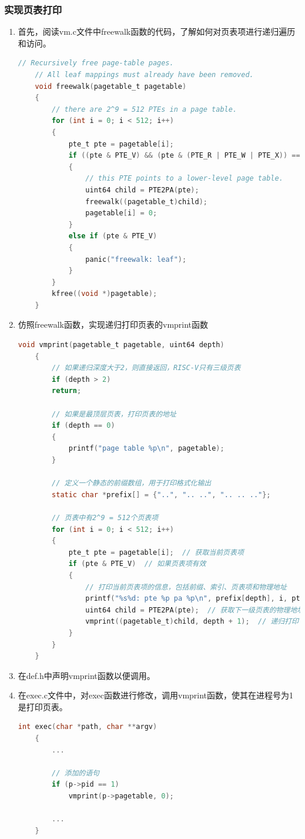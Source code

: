 \subsubsection{实现页表打印}
\begin{enumerate}
    \item 首先，阅读vm.c文件中freewalk函数的代码，了解如何对页表项进行递归遍历和访问。
          \begin{lstlisting}[language=c, title=freewalk函数的原型]
    // Recursively free page-table pages.
    // All leaf mappings must already have been removed.
    void freewalk(pagetable_t pagetable)
    {
        // there are 2^9 = 512 PTEs in a page table.
        for (int i = 0; i < 512; i++)
        {
            pte_t pte = pagetable[i];
            if ((pte & PTE_V) && (pte & (PTE_R | PTE_W | PTE_X)) == 0)
            {
                // this PTE points to a lower-level page table.
                uint64 child = PTE2PA(pte);
                freewalk((pagetable_t)child);
                pagetable[i] = 0;
            }
            else if (pte & PTE_V)
            {
                panic("freewalk: leaf");
            }
        }
        kfree((void *)pagetable);
    }
    \end{lstlisting}
    \item 仿照freewalk函数，实现递归打印页表的vmprint函数
          \begin{lstlisting}[language=c, title=vmprint函数的实现]
    void vmprint(pagetable_t pagetable, uint64 depth)
    {
        // 如果递归深度大于2，则直接返回，RISC-V只有三级页表
        if (depth > 2)
        return;
    
        // 如果是最顶层页表，打印页表的地址
        if (depth == 0)
        {
            printf("page table %p\n", pagetable);
        }
    
        // 定义一个静态的前缀数组，用于打印格式化输出
        static char *prefix[] = {"..", ".. ..", ".. .. .."};
    
        // 页表中有2^9 = 512个页表项
        for (int i = 0; i < 512; i++)
        {
            pte_t pte = pagetable[i];  // 获取当前页表项
            if (pte & PTE_V)  // 如果页表项有效
            {
                // 打印当前页表项的信息，包括前缀、索引、页表项和物理地址
                printf("%s%d: pte %p pa %p\n", prefix[depth], i, pte, PTE2PA(pte));
                uint64 child = PTE2PA(pte);  // 获取下一级页表的物理地址
                vmprint((pagetable_t)child, depth + 1);  // 递归打印下一级页表
            }
        }
    }
    \end{lstlisting}
    \item 在def.h中声明vmprint函数以便调用。
    \item 在exec.c文件中，对exec函数进行修改，调用vmprint函数，使其在进程号为1是打印页表。
          \begin{lstlisting}[language=c, title=对exec函数的修改]
    int exec(char *path, char **argv)
    {
        ...
        
        // 添加的语句
        if (p->pid == 1)
            vmprint(p->pagetable, 0);

        ...
    }    
    \end{lstlisting}
\end{enumerate}
